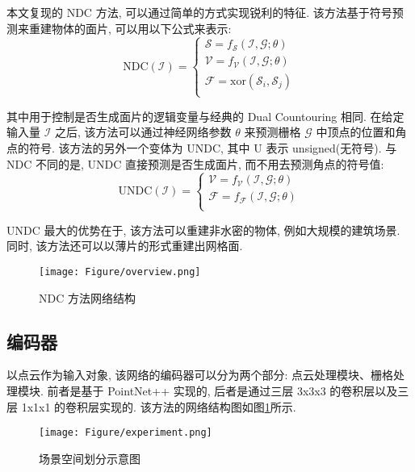 本文复现的 NDC 方法, 可以通过简单的方式实现锐利的特征. 该方法基于符号预测来重建物体的面片, 可以用以下公式来表示: 
\begin{equation}
    \mathrm{NDC}(\mathcal{I}) =
		\begin{cases}
			\mathcal{S} = f_{\mathcal{S}}(\mathcal{I,G};\theta) \\
			\mathcal{V} = f_{\mathcal{V}}(\mathcal{I,G};\theta) \\
			\mathcal{F} = \mathrm{xor}(\mathcal{S}_i, \mathcal{S}_j) \\
		\end{cases}
\end{equation}

其中用于控制是否生成面片的逻辑变量与经典的 Dual Countouring 相同. 在给定输入量 $\mathcal{I}$ 之后, 该方法可以通过神经网络参数 $\theta$ 来预测栅格 $\mathcal{G}$ 中顶点的位置和角点的符号. 
该方法的另外一个变体为 UNDC, 其中 U 表示 unsigned(无符号). 与 NDC 不同的是, UNDC 直接预测是否生成面片, 而不用去预测角点的符号值: 
\begin{equation}
    \mathrm{UNDC}(\mathcal{I}) =
		\begin{cases}
			\mathcal{V} = f_{\mathcal{V}}(\mathcal{I,G};\theta) \\
			\mathcal{F} = f_{\mathcal{F}}(\mathcal{I,G};\theta) \\
		\end{cases}
\end{equation}

UNDC 最大的优势在于, 该方法可以重建非水密的物体, 例如大规模的建筑场景. 同时, 该方法还可以以薄片的形式重建出网格面. 

\begin{figure}[H]
	\center
	\texttt{[image: Figure/overview.png]}
	\centering
	\caption{NDC 方法网络结构}\label{fig:fig-net}
\end{figure}

\subsection{编码器}

以点云作为输入对象, 该网络的编码器可以分为两个部分: 点云处理模块、栅格处理模块. 
前者是基于 PointNet++\cite{qi2017pointnet++} 实现的, 后者是通过三层 3x3x3 的卷积层以及三层 1x1x1 的卷积层实现的. 该方法的网络结构图如图\ref{fig:fig-net}所示. 
\vspace{0.5em} %
\begin{figure}[H]
	\center
	\texttt{[image: Figure/experiment.png]}
	\centering
	\caption{场景空间划分示意图}\label{fig:fig-seg}
\end{figure}

